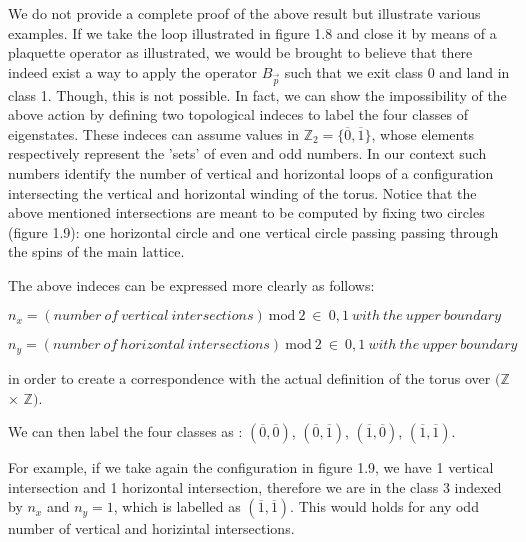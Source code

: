 \documentclass{Configuration_Files/PoliMi3i_thesis}
\begin{document}
We do not provide a complete proof of the above result but illustrate various examples.
If we take the loop illustrated in figure 1.8 and close it by means of a plaquette operator as illustrated, we would be brought to believe that there indeed exist a way to apply the operator $B_{\vec{p}} $ such that we exit class 0 and land in class 1. Though, this is not possible. \newline
In fact, we can show the impossibility of the above action by defining two topological indeces to label the four classes of eigenstates. These indeces can assume values in $\mathbb{Z}_2=\{\overline{0},\overline{1} \}$, whose elements respectively represent the 'sets' of even and odd numbers. In our context such numbers identify the number of vertical and horizontal loops of a configuration intersecting the vertical and horizontal winding of the torus. Notice that the above mentioned intersections are meant to be computed by fixing two circles (figure 1.9): one horizontal circle and one vertical circle passing passing through the spins of the main lattice.

The above indeces can be expressed more clearly as follows: 

\begin{center}
	$n_x= (number \ of \ vertical \ intersections) \ \mathrm{mod} \ 2 \ \in \ {0,1} \ with \ the \ upper \ boundary$
\end{center}
\begin{center}
	$n_y= (number \ of \ horizontal \ intersections) \ \mathrm{mod} \ 2 \ \in \ {0,1} \ with \ the \ upper \ boundary$
\end{center}


in order to create a correspondence with the actual definition of the torus over $(\mathbb{Z}$ $\times$ $\mathbb{Z})$. 

We can then label the four classes as : $(\overline{0},\overline{0} )$, $(\overline{0},\overline{1} )$, $(\overline{1},\overline{0})$, $(\overline{1},\overline{1})$.\newline

For example, if we take again the configuration in figure 1.9, we have 1 vertical intersection and 1 horizontal intersection, therefore we are in the class 3 indexed by $n_x$ and $n_y=1$, which is labelled as $(\overline{1},\overline{1})$. This would holds for any odd number of vertical and horizintal intersections.
\end{document}
